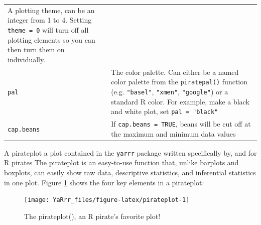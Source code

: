 \documentclass[]{book}
\theoremstyle{definition}
\theoremstyle{definition}
\theoremstyle{remark}
\begin{document}
\begin{longtable}[]{@{}ll@{}}
\begin{minipage}[t]{0.67\columnwidth}
A plotting theme, can be an integer from 1 to 4. Setting
\texttt{theme\ =\ 0} will turn off all plotting elements so you can then
turn them on individually.\strut
\end{minipage}\tabularnewline
\begin{minipage}[t]{0.18\columnwidth}\raggedright\strut
\texttt{pal}\strut
\end{minipage} & \begin{minipage}[t]{0.67\columnwidth}\raggedright\strut
The color palette. Can either be a named color palette from the
\texttt{piratepal()} function (e.g. \texttt{"basel"}, \texttt{"xmen"},
\texttt{"google"}) or a standard R color. For example, make a black and
white plot, set \texttt{pal\ =\ "black"}\strut
\end{minipage}\tabularnewline
\begin{minipage}[t]{0.18\columnwidth}\raggedright\strut
\texttt{cap.beans}\strut
\end{minipage} & \begin{minipage}[t]{0.67\columnwidth}\raggedright\strut
If \texttt{cap.beans\ =\ TRUE}, beans will be cut off at the maximum and
minimum data values\strut
\end{minipage}\tabularnewline
\bottomrule
\end{longtable}

A pirateplot a plot contained in the \texttt{yarrr} package written
specifically by, and for R pirates The pirateplot is an easy-to-use
function that, unlike barplots and boxplots, can easily show raw data,
descriptive statistics, and inferential statistics in one plot. Figure
\ref{fig:pirateplot} shows the four key elements in a pirateplot:

\begin{figure}

{\centering \texttt{[image: YaRrr\_files/figure-latex/pirateplot-1]} 

}

\caption{The pirateplot(), an R pirate's favorite plot!}\label{fig:pirateplot}
\end{figure}
\end{document}
